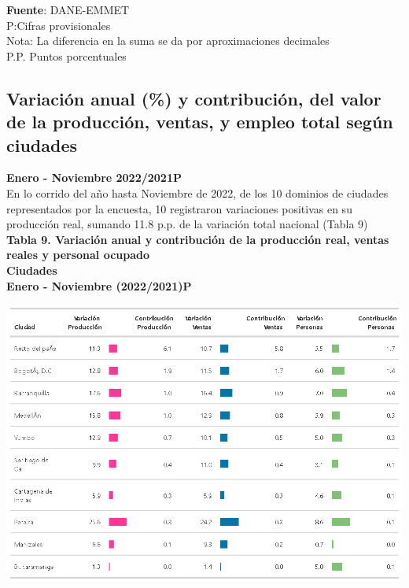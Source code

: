 \documentclass[
]{article}
\begin{document}
\textbf{Fuente}: DANE-EMMET\\
P:Cifras provisionales\\
Nota: La diferencia en la suma se da por aproximaciones decimales\\
P.P. Puntos porcentuales\\

\newpage

\hypertarget{variaciuxf3n-anual-y-contribuciuxf3n-del-valor-de-la-producciuxf3n-ventas-y-empleo-total-seguxfan-ciudades-1}{%
\subsection{Variación anual (\%) y contribución, del valor de la
producción, ventas, y empleo total según
ciudades}\label{variaciuxf3n-anual-y-contribuciuxf3n-del-valor-de-la-producciuxf3n-ventas-y-empleo-total-seguxfan-ciudades-1}}

\textbf{Enero - Noviembre 2022/2021P}\\

En lo corrido del año hasta Noviembre de 2022, de los 10 dominios de
ciudades representados por la encuesta, 10 registraron variaciones
positivas en su producción real, sumando 11.8 p.p. de la variación total
nacional (Tabla 9)\\

\textbf{Tabla 9. Variación anual y contribución de la producción real,
ventas reales y personal ocupado}\\
\textbf{Ciudades}\\
\textbf{Enero - Noviembre (2022/2021)P}\\

\begin{center}\includegraphics[width=12.58in]{tabla9_1} \end{center}
\end{document}

